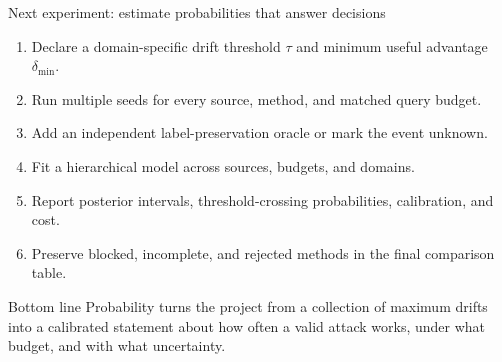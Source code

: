 \documentclass[aspectratio=169,10pt]{beamer}
\begin{document}
\begin{frame}{Next experiment: estimate probabilities that answer decisions}
\begin{enumerate}
\item Declare a domain-specific drift threshold $\tau$ and minimum useful advantage $\delta_{\min}$.
\item Run multiple seeds for every source, method, and matched query budget.
\item Add an independent label-preservation oracle or mark the event unknown.
\item Fit a hierarchical model across sources, budgets, and domains.
\item Report posterior intervals, threshold-crossing probabilities, calibration, and cost.
\item Preserve blocked, incomplete, and rejected methods in the final comparison table.
\end{enumerate}

\vspace{0.8em}
\begin{block}{Bottom line}
Probability turns the project from a collection of maximum drifts into a calibrated statement about how often a valid attack works, under what budget, and with what uncertainty.
\end{block}
\end{frame}
\end{document}
